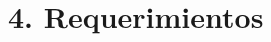 \documentclass[11pt]{charter}
\begin{document}
\clearpage

\section{4. Requerimientos}
\label{sec:requerimientos}






\end{document}
